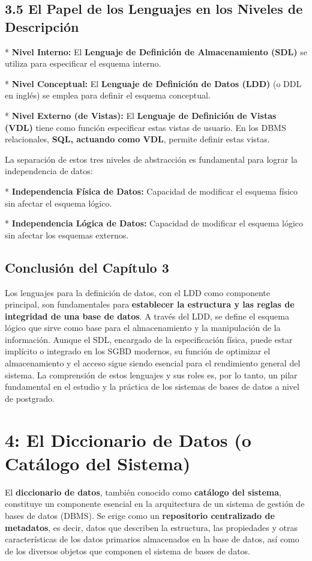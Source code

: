\section{3.5 El Papel de los Lenguajes en los Niveles de Descripción}

*   \textbf{Nivel Interno:}  El \textbf{Lenguaje de Definición de Almacenamiento (SDL)} se utiliza para especificar el esquema interno.

*   \textbf{Nivel Conceptual:} El \textbf{Lenguaje de Definición de Datos (LDD)} (o DDL en inglés) se emplea para definir el esquema conceptual.

*   \textbf{Nivel Externo (de Vistas):}  El \textbf{Lenguaje de Definición de Vistas (VDL)} tiene como función especificar estas vistas de usuario. En los DBMS relacionales, \textbf{SQL, actuando como VDL}, permite definir estas vistas.

La separación de estos tres niveles de abstracción es fundamental para lograr la independencia de datos:

*   \textbf{Independencia Física de Datos:} Capacidad de modificar el esquema físico sin afectar el esquema lógico.

*   \textbf{Independencia Lógica de Datos:} Capacidad de modificar el esquema lógico sin afectar los esquemas externos.

\section{Conclusión del Capítulo 3}

Los lenguajes para la definición de datos, con el LDD como componente principal, son fundamentales para \textbf{establecer la estructura y las reglas de integridad de una base de datos}. A través del LDD, se define el esquema lógico que sirve como base para el almacenamiento y la manipulación de la información. Aunque el SDL, encargado de la especificación física, puede estar implícito o integrado en los SGBD modernos, su función de optimizar el almacenamiento y el acceso sigue siendo esencial para el rendimiento general del sistema. La comprensión de estos lenguajes y sus roles es, por lo tanto, un pilar fundamental en el estudio y la práctica de los sistemas de bases de datos a nivel de postgrado.

\chapter{4: El Diccionario de Datos (o Catálogo del Sistema)}

El \textbf{diccionario de datos}, también conocido como \textbf{catálogo del sistema}, constituye un componente esencial en la arquitectura de un sistema de gestión de bases de datos (DBMS). Se erige como un \textbf{repositorio centralizado de metadatos}, es decir, datos que describen la estructura, las propiedades y otras características de los datos primarios almacenados en la base de datos, así como de los diversos objetos que componen el sistema de bases de datos.
